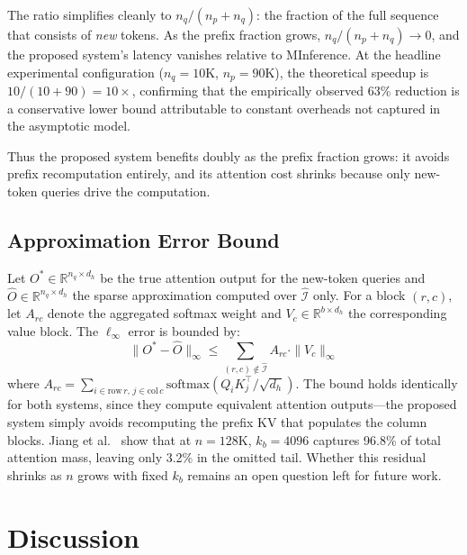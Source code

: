 \documentclass{article}
\begin{document}
The ratio simplifies cleanly to $n_q / (n_p + n_q)$: the fraction of the
full sequence that consists of \textit{new} tokens. As the prefix
fraction grows, $n_q / (n_p + n_q) \to 0$, and the proposed system's
latency vanishes relative to MInference. At the headline experimental
configuration ($n_q = 10\text{K}$, $n_p = 90\text{K}$), the theoretical
speedup is $10/(10+90) = 10\times$, confirming that the empirically
observed 63\% reduction is a conservative lower bound attributable to
constant overheads not captured in the asymptotic model.

Thus the proposed system benefits doubly as the prefix fraction grows:
it avoids prefix recomputation entirely, and its attention cost shrinks
because only new-token queries drive the computation.

\subsection{Approximation Error Bound}
\label{sec:error-bound}

Let $O^* \in \mathbb{R}^{n_q \times d_h}$ be the true attention output
for the new-token queries and $\hat{O} \in \mathbb{R}^{n_q \times d_h}$
the sparse approximation computed over $\hat{\mathcal{I}}$ only. For a
block $(r, c)$, let $A_{rc}$ denote the aggregated softmax weight and
$V_c \in \mathbb{R}^{b \times d_h}$ the corresponding value block. The
$\ell_\infty$ error is bounded by:
%
\begin{equation}
  \|O^* - \hat{O}\|_\infty
  \leq \sum_{(r,c) \notin \hat{\mathcal{I}}} A_{rc} \cdot \|V_c\|_\infty
  \label{eq:error-bound}
\end{equation}
%
where $A_{rc} = \sum_{i \in \text{row}\,r,\,j \in \text{col}\,c}
\text{softmax}(Q_i K_j^\top / \sqrt{d_h})$. The bound holds identically
for both systems, since they compute equivalent attention outputs---the
proposed system simply avoids recomputing the prefix KV that populates the
column blocks. Jiang et al.\ \cite{minference} show that at $n = 128\text{K}$,
$k_b = 4096$ captures 96.8\% of total attention mass, leaving only 3.2\%
in the omitted tail. Whether this residual shrinks as $n$ grows with
fixed $k_b$ remains an open question left for future work.

\section{Discussion}
\label{sec:discussion}
\end{document}
